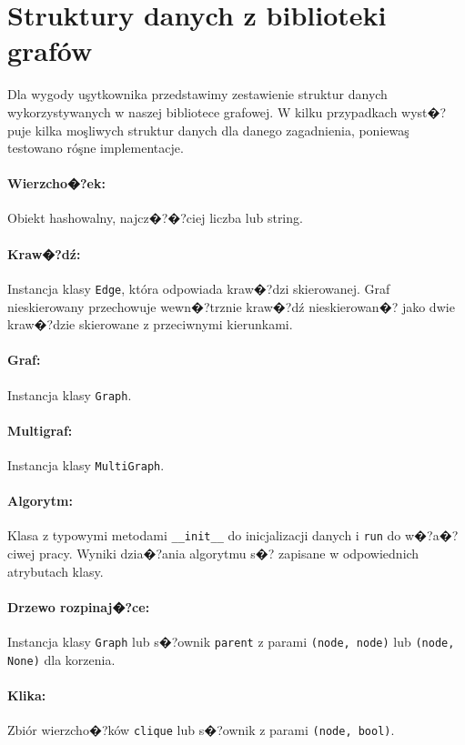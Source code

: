 \documentclass[12pt,a4paper]{mwrep}
\begin{document}
\section{Struktury danych z biblioteki grafów}
\label{sec:struktury_danych}

Dla wygody uşytkownika przedstawimy zestawienie struktur danych
wykorzystywanych w naszej bibliotece grafowej.
W kilku przypadkach wyst�?puje kilka moşliwych struktur danych 
dla danego zagadnienia, poniewaş testowano róşne implementacje.

\paragraph{Wierzcho�?ek:} Obiekt hashowalny, najcz�?�?ciej liczba
lub string.

\paragraph{Kraw�?dź:} Instancja klasy \lstinline|Edge|, która odpowiada
kraw�?dzi skierowanej. Graf nieskierowany przechowuje wewn�?trznie
kraw�?dź nieskierowan�? jako dwie kraw�?dzie skierowane
z przeciwnymi kierunkami.

\paragraph{Graf:} Instancja klasy \lstinline|Graph|.

\paragraph{Multigraf:} Instancja klasy \lstinline|MultiGraph|.

\paragraph{Algorytm:} Klasa z typowymi metodami \lstinline|__init__|
do inicjalizacji danych i \lstinline|run| do w�?a�?ciwej pracy. 
Wyniki dzia�?ania algorytmu s�? zapisane w odpowiednich atrybutach klasy.

\paragraph{Drzewo rozpinaj�?ce:} Instancja klasy \lstinline|Graph|
lub s�?ownik \lstinline|parent| z parami \lstinline|(node, node)| lub
\lstinline|(node, None)| dla korzenia.

\paragraph{Klika:} Zbiór wierzcho�?ków \lstinline|clique|
lub s�?ownik z parami \lstinline|(node, bool)|.
\end{document}
